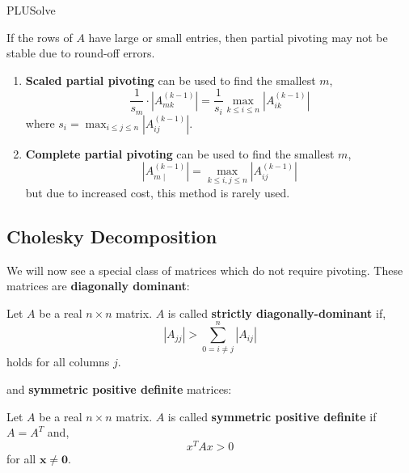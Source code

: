 \begin{algorithm}
	  \caption{PLUSolve}\label{PLUSolve}
\end{algorithm}

\begin{marginfigure}
	If the rows of $A$ have large or small entries, then partial pivoting may not be stable due to round-off errors.
\end{marginfigure}

\begin{rmk}
	\hfill
	\begin{enumerate}
		\item \textbf{Scaled partial pivoting} can be used to find the smallest $m$,
		\[\frac{1}{s_m} \cdot |A_{m k}^{(k-1)}| = \frac{1}{s_i} \max _{k \leq i \leq n} |A_{i k}^{(k-1)}| \]
		where $s_i=\max _{i \leq j \leq n}|A_{i j}^{(k-1)}|$.
		\item \textbf{Complete partial pivoting} can be used to find the smallest $m$,
		\[\left|A_{m \mid}^{(k-1)}\right|=\max _{k \leq i, j \leq n}\left|A_{i j}^{(k-1)}\right|\]
		but due to increased cost, this method is rarely used.
	\end{enumerate}
\end{rmk}

\subsection{Cholesky Decomposition}
We will now see a special class of matrices which do not require pivoting. These matrices are \textbf{diagonally dominant}:

\begin{defn}
	\sloppy Let $A$ be a real $n \times n$ matrix. $A$ is called \textbf{strictly diagonally-dominant} if,
	\[\left|A_{j j}\right|>\sum_{0=i \neq j}^n\left|A_{i j}\right|\]
	holds for all columns $j$.
\end{defn}

\NewLine

\noindent and \textbf{symmetric positive definite} matrices:

\NewLine

\begin{defn}
	Let $A$ be a real $n \times n$ matrix. $A$ is called \textbf{symmetric positive definite} if $A = A^T$ and,
	\[x^T A x>0\]
	for all $\mathbf{x} \neq \mathbf{0}$.
\end{defn}

